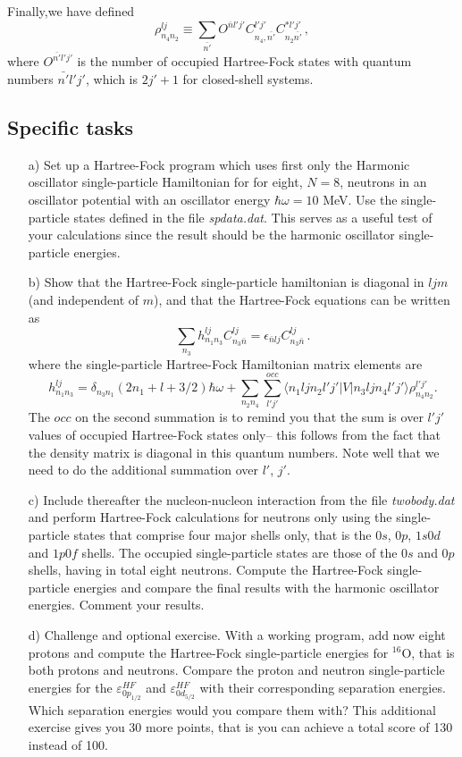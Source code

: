 \documentclass[11pt,a4wide]{article}
\begin{document}
Finally,we have defined
\begin{equation}
\rho^{lj}_{n_4n_2} \equiv \sum_{\bar{n'}} O^{\bar{n}l'j'}C^{l'j'}_{n_4,\bar{n'}}C^{*l'j'}_{n_2\bar{n'}}\,,
\end{equation}
where $O^{\bar{n'}l'j'}$ is the number of occupied Hartree-Fock states with
quantum numbers $\bar{n'}l'j'$, which is $2j'+1$ for closed-shell
systems.


\subsection*{Specific tasks}

\begin{enumerate} 
\item[a)] Set up a Hartree-Fock program which uses first only the
  Harmonic oscillator single-particle Hamiltonian for for eight,
  $N=8$, neutrons in an oscillator potential with an oscillator
  energy $\hbar\omega =10$ MeV. Use the single-particle states
  defined in the file {\em spdata.dat}. This serves as a useful test
  of your calculations since the result should be the harmonic
  oscillator single-particle energies.
\item[b)] Show that the Hartree-Fock single-particle hamiltonian is diagonal in
  $ljm$ (and independent of $m$), and that the Hartree-Fock equations can be
  written as
\[
\sum_{n_3} h^{lj}_{n_1n_3}C^{lj}_{n_3\bar{n}} = \epsilon_{\bar{n}lj}C^{lj}_{n_3\bar{n}}\,.
\]
 where the single-particle Hartree-Fock Hamiltonian matrix elements are 
\[
h^{lj}_{n_1n_3} = \delta_{n_3 n_1}(2n_1+l + 3/2)\hbar\omega + \sum_{n_2n_4}\sum_{l'j'}^{occ}\langle n_1ljn_2l'j'|V|n_3ljn_4l'j'\rangle\rho^{l'j'}_{n_4n_2}.
\]
The $occ$ on the second summation is to remind you that the sum is
over $l'j'$ values of occupied Hartree-Fock states only-- this follows from the
fact that the density matrix is diagonal in this quantum numbers. Note
well that we need to do the additional summation over $l'$, $j'$.
\item[c)] Include thereafter the nucleon-nucleon interaction from the
  file {\em twobody.dat} and perform Hartree-Fock calculations for
  neutrons only using the single-particle states that comprise four
  major shells only, that is the $0s$, $0p$, $1s0d$ and $1p0f$ shells.
  The occupied single-particle states are those of the $0s$ and $0p$
  shells, having in total eight neutrons.  Compute the Hartree-Fock
  single-particle energies and compare the final results with the
  harmonic oscillator energies. Comment your results.
\item[d)] Challenge and optional exercise. With a working program, add
  now eight protons and compute the Hartree-Fock single-particle
  energies for $^{16}$O, that is both protons and neutrons. Compare
  the proton and neutron single-particle energies for the
  $\varepsilon^{HF}_{0p_{1/2}}$ and $\varepsilon^{HF}_{0d_{5/2}}$ with
  their corresponding separation energies. Which separation energies
  would you compare them with?  This additional exercise gives you 30
  more points, that is you can achieve a total score of 130 instead of
  100.

\end{enumerate}
\end{document}
